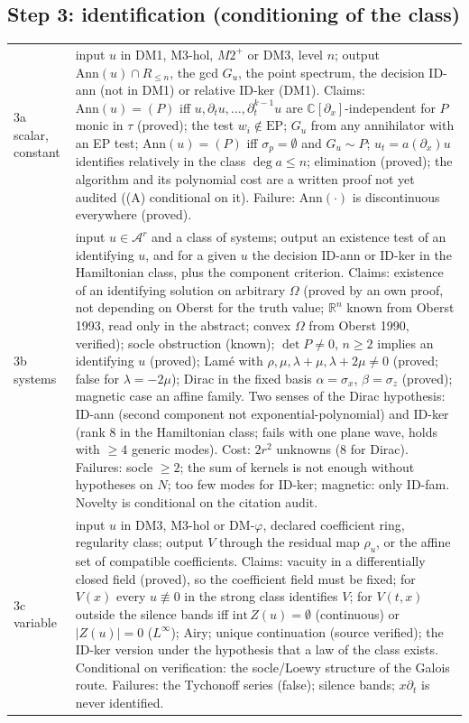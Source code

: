 \documentclass[11pt]{article}
\theoremstyle{plain}
\theoremstyle{definition}
\theoremstyle{remark}
\newcommand{\R}{\mathbb{R}}
\newcommand{\C}{\mathbb{C}}
\begin{document}
\subsection*{Step 3: identification (conditioning of the class)}
\begin{tabular}{@{}p{2.2cm}p{9.6cm}@{}}
\toprule
3a scalar, constant & input $u$ in DM1, M3-hol, $M2^+$ or DM3, level $n$; output $\mathrm{Ann}(u)\cap R_{\le n}$, the gcd $G_u$, the point spectrum, the decision ID-ann (not in DM1) or relative ID-ker (DM1). Claims: $\mathrm{Ann}(u)=(P)$ iff $u,\partial_tu,\dots,\partial_t^{k-1}u$ are $\C[\partial_x]$-independent for $P$ monic in $\tau$ (proved); the test $w_i\notin\mathrm{EP}$; $G_u$ from any annihilator with an EP test; $\mathrm{Ann}(u)=(P)$ iff $\sigma_p=\emptyset$ and $G_u\sim P$; $u_t=a(\partial_x)u$ identifies relatively in the class $\deg a\le n$; elimination (proved); the algorithm and its polynomial cost are a written proof not yet audited ((A) conditional on it). Failure: $\mathrm{Ann}(\cdot)$ is discontinuous everywhere (proved).\\
3b systems & input $u\in\mathcal A^r$ and a class of systems; output an existence test of an identifying $u$, and for a given $u$ the decision ID-ann or ID-ker in the Hamiltonian class, plus the component criterion. Claims: existence of an identifying solution on arbitrary $\Omega$ (proved by an own proof, not depending on Oberst for the truth value; $\R^n$ known from Oberst 1993, read only in the abstract; convex $\Omega$ from Oberst 1990, verified); socle obstruction (known); $\det P\ne0$, $n\ge2$ implies an identifying $u$ (proved); Lam\'e with $\rho,\mu,\lambda+\mu,\lambda+2\mu\ne0$ (proved; false for $\lambda=-2\mu$); Dirac in the fixed basis $\alpha=\sigma_x$, $\beta=\sigma_z$ (proved); magnetic case an affine family. Two senses of the Dirac hypothesis: ID-ann (second component not exponential-polynomial) and ID-ker (rank 8 in the Hamiltonian class; fails with one plane wave, holds with $\ge4$ generic modes). Cost: $2r^2$ unknowns (8 for Dirac). Failures: socle $\ge2$; the sum of kernels is not enough without hypotheses on $N$; too few modes for ID-ker; magnetic: only ID-fam. Novelty is conditional on the citation audit.\\
3c variable & input $u$ in DM3, M3-hol or DM-$\varphi$, declared coefficient ring, regularity class; output $V$ through the residual map $\rho_u$, or the affine set of compatible coefficients. Claims: vacuity in a differentially closed field (proved), so the coefficient field must be fixed; for $V(x)$ every $u\not\equiv0$ in the strong class identifies $V$; for $V(t,x)$ outside the silence bands iff $\mathrm{int}\,Z(u)=\emptyset$ (continuous) or $\lvert Z(u)\rvert=0$ ($L^\infty$); Airy; unique continuation (source verified); the ID-ker version under the hypothesis that a law of the class exists. Conditional on verification: the socle/Loewy structure of the Galois route. Failures: the Tychonoff series (false); silence bands; $x\partial_t$ is never identified.\\
\bottomrule
\end{tabular}
\end{document}
